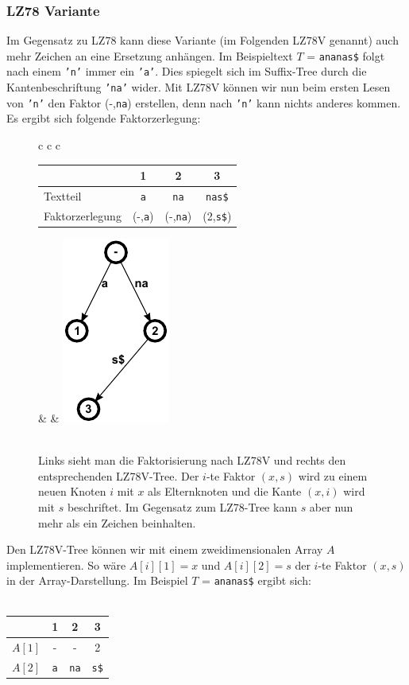 \documentclass[a4paper,11pt]{scrartcl}%
\theoremstyle{nonumberplain}
\theoremstyle{change}
\theoremstyle{nonumberplain}
\theoremstyle{change}
\theoremstyle{nonumberplain}
\begin{document}
	\subsubsection{LZ78 Variante}
	Im Gegensatz zu LZ78 kann diese Variante (im Folgenden LZ78V genannt) auch mehr Zeichen an eine Ersetzung anhängen.
	Im Beispieltext $T$ = \texttt{ananas\$} folgt nach einem \texttt{'n'} immer ein \texttt{'a'}. Dies spiegelt sich im Suffix-Tree durch die Kantenbeschriftung \texttt{'na'} wider. Mit LZ78V können wir nun beim ersten Lesen von \texttt{'n'} den Faktor (-,\texttt{na}) erstellen, denn nach \texttt{'n'} kann nichts anderes kommen. Es ergibt sich folgende Faktorzerlegung:\\
	\begin{figure}[h]
	\begin{tabular}[t]{c c c}
		\begin{tabular}[b]{l c c c}\hline
			& 1 & 2 & 3  \\ \hline
  		Textteil & \texttt{a} & \texttt{na} & \texttt{nas\$} \\ \hline
  		Faktorzerlegung & (-,\texttt{a}) & (-,\texttt{na}) & (2,\texttt{s\$}) \\ \hline
		\end{tabular} & \hspace{2cm} & \includegraphics{ananas_LZ78VTree}\\\\
	\end{tabular}
	\caption{Links sieht man die Faktorisierung nach LZ78V und rechts den entsprechenden LZ78V-Tree. Der $i$-te Faktor $(x,s)$ wird zu einem neuen Knoten $i$ mit $x$ als Elternknoten und die Kante $(x,i)$ wird mit $s$ beschriftet. Im Gegensatz zum LZ78-Tree kann $s$ aber nun mehr als ein Zeichen beinhalten.}
	\label{fig:lz78v}
	\end{figure}
	
	Den LZ78V-Tree können wir mit einem zweidimensionalen Array $A$ implementieren. So wäre $A[i][1] = x$ und $A[i][2] = s$ der $i$-te Faktor $(x,s)$ in der Array-Darstellung. Im Beispiel $T$ = \texttt{ananas\$} ergibt sich:\\\\
	\begin{tabular}[b]{l c c c}
						\hline
							& 1 & 2 & 3 \\\hline
						$A[1]$ & - & - & 2 \\\hline
						$A[2]$	& \texttt{a} & \texttt{na} & \texttt{s\$}\\\hline
						
			
	\end{tabular}
	
\end{document}
